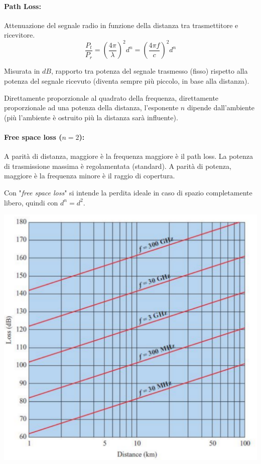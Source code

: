 \paragraph{Path Loss:} Attenuazione del segnale radio in funzione della distanza tra trasmettitore e ricevitore.
$$ \frac{P_t}{P_r} = \left(\frac{4 \pi}{\lambda}\right)^2 d^n = \left(\frac{4 \pi f}{c}\right)^2 d^n $$

Misurata in $dB$, rapporto tra potenza del segnale trasmesso (fisso) rispetto alla potenza del segnale ricevuto (diventa sempre più piccolo, in base alla distanza).

Direttamente proporzionale al quadrato della frequenza, direttamente proporzionale ad una potenza della distanza, l'esponente $n$ dipende dall'ambiente (più l'ambiente è ostruito più la distanza sarà influente).


\paragraph{Free space loss ($n=2$):} A parità di distanza, maggiore è la frequenza maggiore è il path loss. La potenza di trasmissione massima è regolamentata (standard). A parità di potenza, maggiore è la frequenza minore è il raggio di copertura. 

Con "\textit{free space loss}" si intende la perdita ideale in caso di spazio completamente libero, quindi con $d^n = d^2$.
\begin{center}
	\includegraphics[width=0.75\linewidth]{img/wireless/freespaceloss}
\end{center}

